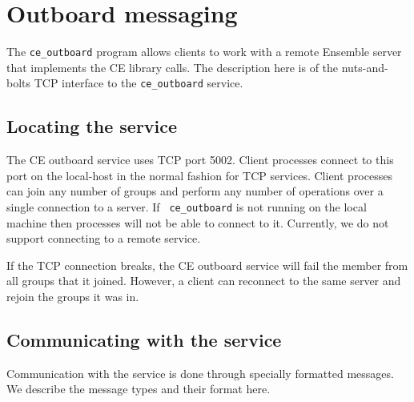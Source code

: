 %
%
%
\section{Outboard messaging}

The {\tt ce\_outboard} program allows clients to work with a remote Ensemble server
that implements the CE library calls. The description here is of the
nuts-and-bolts TCP interface to the {\tt ce\_outboard} service.


\subsection{Locating the service}
The CE outboard service uses TCP port 5002. Client
processes connect to this port on the local-host in the normal fashion for TCP
services. Client processes can join any number of groups and perform
any number of operations over a single connection to a server. If {\tt
  ce\_outboard} is not running on the local machine then processes
will not be able to connect to it. Currently, we do not support 
connecting to a remote service. 

If the TCP connection breaks, the CE outboard service will fail the
member from all groups that it joined.  However, a client can
reconnect to the same server and rejoin the groups it was in. 

\subsection{Communicating with the service}
Communication with the service is done through specially formatted
messages.  We describe the message types and their format here.

